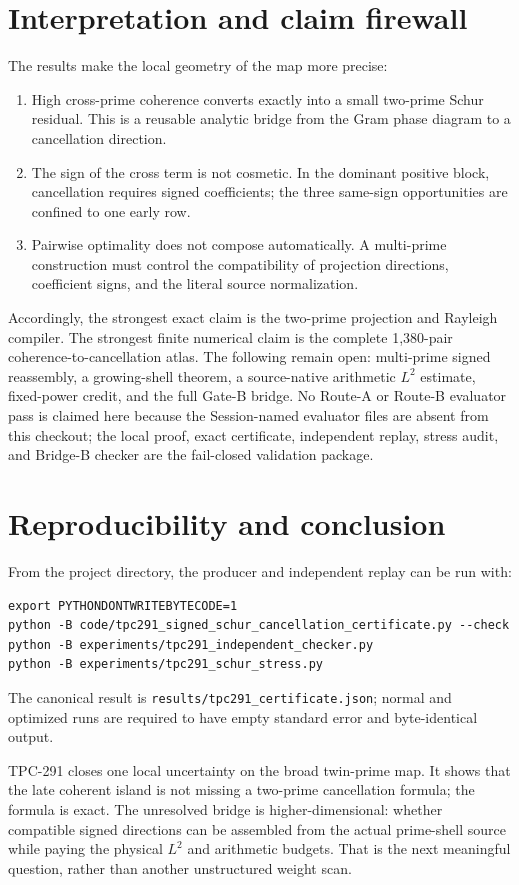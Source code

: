 \documentclass[10pt]{article}
\begin{document}
\section{Interpretation and claim firewall}

The results make the local geometry of the map more precise:

\begin{enumerate}
\item High cross-prime coherence converts exactly into a small two-prime
      Schur residual.  This is a reusable analytic bridge from the Gram
      phase diagram to a cancellation direction.
\item The sign of the cross term is not cosmetic.  In the dominant positive
      block, cancellation requires signed coefficients; the three same-sign
      opportunities are confined to one early row.
\item Pairwise optimality does not compose automatically.  A multi-prime
      construction must control the compatibility of projection directions,
      coefficient signs, and the literal source normalization.
\end{enumerate}

Accordingly, the strongest exact claim is the two-prime projection and
Rayleigh compiler.  The strongest finite numerical claim is the complete
1,380-pair coherence-to-cancellation atlas.  The following remain open:
multi-prime signed reassembly, a growing-shell theorem, a source-native
arithmetic $L^2$ estimate, fixed-power credit, and the full Gate-B bridge.
No Route-A or Route-B evaluator pass is claimed here because the
Session-named evaluator files are absent from this checkout; the local
proof, exact certificate, independent replay, stress audit, and Bridge-B
checker are the fail-closed validation package.

\section{Reproducibility and conclusion}

From the project directory, the producer and independent replay can be run
with:
\begin{verbatim}
export PYTHONDONTWRITEBYTECODE=1
python -B code/tpc291_signed_schur_cancellation_certificate.py --check
python -B experiments/tpc291_independent_checker.py
python -B experiments/tpc291_schur_stress.py
\end{verbatim}
The canonical result is
\texttt{results/tpc291\_certificate.json}; normal and optimized runs are
required to have empty standard error and byte-identical output.

TPC-291 closes one local uncertainty on the broad twin-prime map.  It shows
that the late coherent island is not missing a two-prime cancellation
formula; the formula is exact.  The unresolved bridge is higher-dimensional:
whether compatible signed directions can be assembled from the actual
prime-shell source while paying the physical $L^2$ and arithmetic budgets.
That is the next meaningful question, rather than another unstructured
weight scan.



\end{document}
